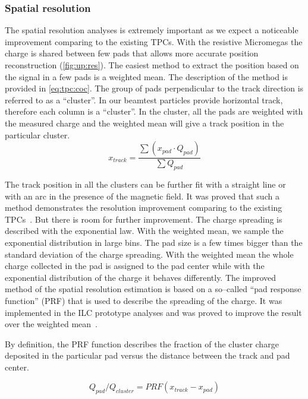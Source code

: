 \documentclass[../main.tex]{subfiles}
\begin{document}
\subsubsection{Spatial resolution}
The spatial resolution analyses is extremely important as we expect a noticeable improvement comparing to the existing TPCs. With the resistive Micromegas the charge is shared between few pads that allows more accurate position reconstruction (\autoref{fig:up:res}). The easiest method to extract the position based on the signal in a few pads is a weighted mean. The description of the method is provided in \autoref{eq:tpc:coc}. The group of pads perpendicular to the track direction is referred to as a ``cluster''. In our beamtest particles provide horizontal track, therefore each column is a ``cluster''. In the cluster, all the pads are weighted with the measured charge and the weighted mean will give a track position in the particular cluster.
\begin{equation}
\label{eq:tpc:coc}
x_{track} = \frac{\sum (x_{pad} \cdot Q_{pad})}{\sum Q_{pad}}
\end{equation}

The track position in all the clusters can be further fit with a straight line or with an arc in the presence of the magnetic field. It was proved that such a method demonstrates the resolution improvement comparing to the existing TPCs~\cite{Dixit2004}. But there is room for further improvement. The charge spreading is described with the exponential law. With the weighted mean, we sample the exponential distribution in large bins. The pad size is a few times bigger than the standard deviation of the charge spreading. With the weighted mean the whole charge collected in the pad is assigned to the pad center while with the exponential distribution of the charge it behaves differently. The improved method of the spatial resolution estimation is based on a so--called ``pad response function'' (PRF) that is used to describe the spreading of the charge. It was implemented in the ILC prototype analyses and was proved to improve the result over the weighted mean~\cite{Attie2011}.

By definition, the PRF function describes the fraction of the cluster charge deposited in the particular pad versus the distance between the track and pad center.

\begin{equation}
Q_{pad}/Q_{cluster} = PRF\left(x_{track} - x_{pad}\right)
\label{eq:prf_def}
\end{equation}
\end{document}
